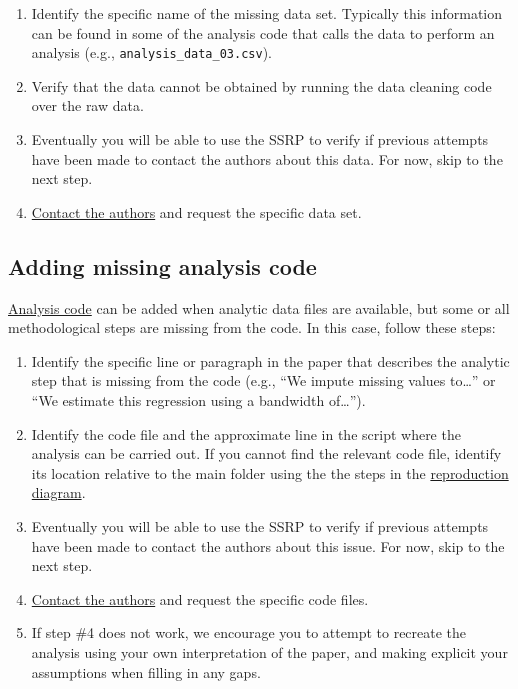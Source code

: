 \documentclass[
  openany]{book}
\providecommand{\tightlist}{%
  \setlength{\itemsep}{0pt}\setlength{\parskip}{0pt}}
\begin{document}
\begin{enumerate}
\def\labelenumi{\arabic{enumi}.}
\tightlist
\item
  Identify the specific name of the missing data set. Typically this information can be found in some of the analysis code that calls the data to perform an analysis (e.g., \texttt{analysis\_data\_03.csv}).\\
\item
  Verify that the data cannot be obtained by running the data cleaning code over the raw data.\\
\item
  Eventually you will be able to use the SSRP to verify if previous attempts have been made to contact the authors about this data. For now, skip to the next step.\\
\item
  \protect\hyperlink{tips-for-communication}{Contact the authors} and request the specific data set.
\end{enumerate}

\hypertarget{ac}{%
\subsection{Adding missing analysis code}\label{ac}}

\protect\hyperlink{describe-inputs}{Analysis code} can be added when analytic data files are available, but some or all methodological steps are missing from the code. In this case, follow these steps:

\begin{enumerate}
\def\labelenumi{\arabic{enumi}.}
\tightlist
\item
  Identify the specific line or paragraph in the paper that describes the analytic step that is missing from the code (e.g., ``We impute missing values to\ldots{}'' or ``We estimate this regression using a bandwidth of\ldots{}'').\\
\item
  Identify the code file and the approximate line in the script where the analysis can be carried out. If you cannot find the relevant code file, identify its location relative to the main folder using the the steps in the \protect\hyperlink{diagram}{reproduction diagram}.\\
\item
  Eventually you will be able to use the SSRP to verify if previous attempts have been made to contact the authors about this issue. For now, skip to the next step.
\item
  \protect\hyperlink{tips-for-communication}{Contact the authors} and request the specific code files.\\
\item
  If step \#4 does not work, we encourage you to attempt to recreate the analysis using your own interpretation of the paper, and making explicit your assumptions when filling in any gaps.
\end{enumerate}
\end{document}

